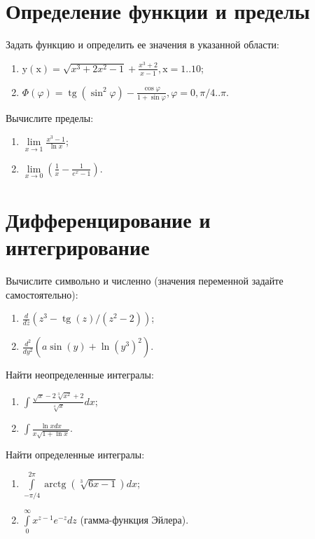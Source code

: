\documentclass[14pt,a4paper]{article}
\begin{document}
\section{Определение функции и пределы}
\noindent Задать функцию и определить ее значения в указанной области:

\begin{enumerate}
	\item $\mathrm{y}(\mathrm{x})=\sqrt{x^3+2 x^2-1}+\frac{x^3+2}{x-1}, \mathrm{x}=1 . .10$;
	\item $\Phi(\varphi)=\operatorname{tg}\left(\sin ^2 \varphi\right)-\frac{\cos \varphi}{1+\sin \varphi}, \varphi=0, \pi / 4 . . \pi$.
\end{enumerate}
\noindent Вычислите пределы:
\begin{multicols}{2}
\begin{enumerate}
	\item $\lim\limits_{x \rightarrow 1} \frac{x^3-1}{\ln x}$;
	\item $\lim\limits_{x \rightarrow 0}\left(\frac{1}{x}-\frac{1}{e^x-1}\right)$.
\end{enumerate}
\end{multicols}
\section{Дифференцирование и интегрирование}
\noindent Вычислите символьно и численно (значения переменной задайте самостоятельно):
\begin{multicols}{2}
\begin{enumerate}
	\item $\frac{d}{d z}\left(z^3-\operatorname{tg}(z) /\left(z^2-2\right)\right)$;
	\item $\frac{d^2}{d y^2}\left(a \sin (y)+\ln \left(y^3\right)^2\right)$.
\end{enumerate}
\end{multicols}
\noindent Найти неопределенные интегралы:
\begin{multicols}{2}
\begin{enumerate}
	\item $\int \frac{\sqrt{x}-2 \sqrt[3]{x^2}+2}{\sqrt[4]{x}} dx$;
	\item $\int \frac{\ln x d x}{x \sqrt{1+\ln x}}$.
\end{enumerate}
\end{multicols}
\noindent Найти определенные интегралы:
\begin{multicols}{2}
\begin{enumerate}
	\item $\int\limits_{-\pi/4}^{2\pi} \operatorname{arctg}(\sqrt[3]{6 x-1}) d x$;
	\item $\int\limits_{0}^{\infty} x^{z-1}e^{-z}dz$ (гамма-функция Эйлера).
\end{enumerate}
\end{multicols}
\nocite{Plis2003,Krestlev2010,MathCADshortcuts,Ochkov2016}
\printbibliography[title={Рекомендуемая литература}]
\end{document}
